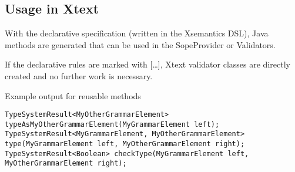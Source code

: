 \subsection{Usage in Xtext}

With the declarative specification (written in the Xsemantics DSL), Java methods are generated that can be used in the SopeProvider or Validators. 

If the declarative rules are marked with […], Xtext validator classes are directly created and no further work is necessary.

Example output for reusable methods

\begin{lstlisting}
TypeSystemResult<MyOtherGrammarElement> typeAsMyOtherGrammarElement(MyGrammarElement left); 
TypeSystemResult<MyGrammarElement, MyOtherGrammarElement> type(MyGrammarElement left, MyOtherGrammarElement right); 
TypeSystemResult<Boolean> checkType(MyGrammarElement left, MyOtherGrammarElement right); 
\end{lstlisting}
